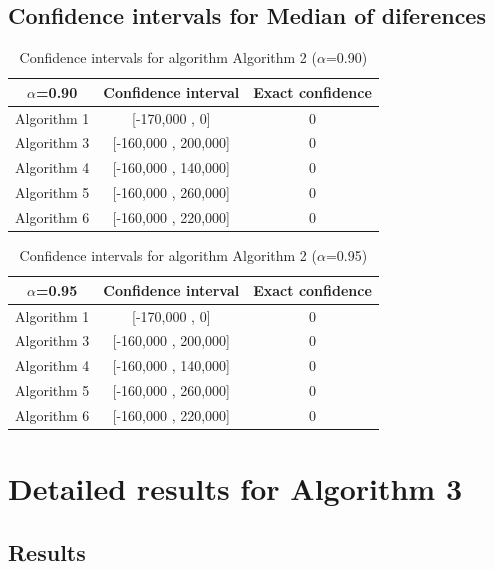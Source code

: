\documentclass[a4paper,10pt]{article}
\begin{document}
\subsection{Confidence intervals for Median of diferences}

\begin{table}[!htp]
\centering\small
\begin{tabular}{
|c|c|c|}
\hline
 $\alpha$=0.90 & Confidence interval & Exact confidence \\ \hline 
Algorithm 1 & [-170,000 , 0] & 0\\ \hline 
Algorithm 3 & [-160,000 , 200,000] & 0\\ \hline 
Algorithm 4 & [-160,000 , 140,000] & 0\\ \hline 
Algorithm 5 & [-160,000 , 260,000] & 0\\ \hline 
Algorithm 6 & [-160,000 , 220,000] & 0\\ \hline 

\end{tabular}
\caption{Confidence intervals for algorithm Algorithm 2 ($\alpha$=0.90)}
\end{table}
\begin{table}[!htp]
\centering\small
\begin{tabular}{
|c|c|c|}
\hline
 $\alpha$=0.95 & Confidence interval & Exact confidence \\ \hline 
Algorithm 1 & [-170,000 , 0] & 0\\ \hline 
Algorithm 3 & [-160,000 , 200,000] & 0\\ \hline 
Algorithm 4 & [-160,000 , 140,000] & 0\\ \hline 
Algorithm 5 & [-160,000 , 260,000] & 0\\ \hline 
Algorithm 6 & [-160,000 , 220,000] & 0\\ \hline 

\end{tabular}
\caption{Confidence intervals for algorithm Algorithm 2 ($\alpha$=0.95)}
\end{table}

 \clearpage 


\section{Detailed results for Algorithm 3}


\subsection{Results}
\end{document}
